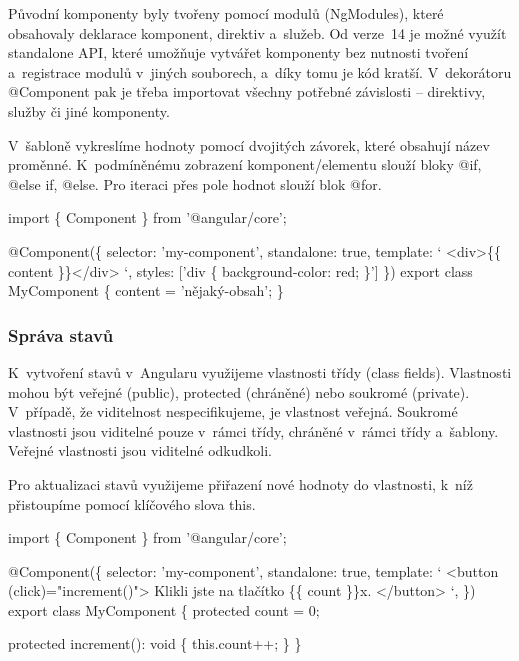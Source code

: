 Původní komponenty byly tvořeny pomocí modulů (NgModules), které obsahovaly deklarace komponent, direktiv a~služeb. 
Od verze~14 je možné využít standalone API, které umožňuje vytvářet komponenty bez nutnosti tvoření a~registrace modulů v~jiných souborech, a~díky tomu je kód kratší. 
V~dekorátoru @Component pak je třeba importovat všechny potřebné závislosti -- direktivy, služby či jiné komponenty.\cite{angulardev,learningangular}

V~šabloně vykreslíme hodnoty pomocí dvojitých závorek, které obsahují název proměnné. K~podmíněnému zobrazení komponent/elementu slouží bloky @if, @else if, @else. 
Pro iteraci přes pole hodnot slouží blok @for.\cite{angulardev}

\begin{prog}
import \{ Component \} from '@angular/core';

@Component(\{
  selector: 'my-component',
  standalone: true,
  template: `
    <div>\{\{ content \}\}</div>
  `,
  styles: ['div \{ background-color: red; \}']
\})
export class MyComponent \{
  content = 'nějaký-obsah';
\}
\end{prog}

\subsubsection{Správa stavů}

K~vytvoření stavů v~Angularu využijeme vlastnosti třídy (class fields). Vlastnosti mohou být veřejné (public), protected (chráněné) nebo soukromé (private). 
V~případě, že viditelnost nespecifikujeme, je vlastnost veřejná. Soukromé vlastnosti jsou viditelné pouze v~rámci třídy, chráněné v~rámci třídy a~šablony. 
Veřejné vlastnosti jsou viditelné odkudkoli.\cite{angulardev,learningangular}

Pro aktualizaci stavů využijeme přiřazení nové hodnoty do vlastnosti, k~níž přistoupíme pomocí klíčového slova this.\cite{angulardev}

\begin{prog}
import \{ Component \} from '@angular/core';

@Component(\{
  selector: 'my-component',
  standalone: true,
  template: `
    <button (click)="increment()">
      Klikli jste na tlačítko \{\{ count \}\}x.
    </button>
  `,
\})
export class MyComponent \{
  protected count = 0;

  protected increment(): void \{
    this.count++;
  \}
\}
\end{prog}

